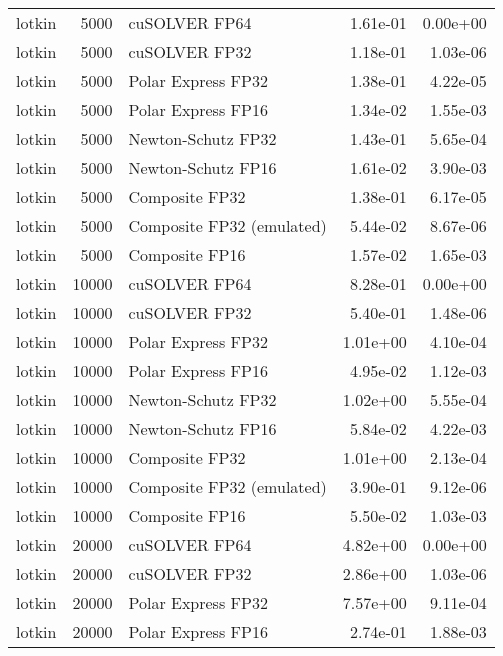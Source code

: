 \begin{table}
\begin{tabular}{lrlrr}
   lotkin &  5000 &             cuSOLVER FP64 &  1.61e-01 &        0.00e+00 \\
   lotkin &  5000 &             cuSOLVER FP32 &  1.18e-01 &        1.03e-06 \\
   lotkin &  5000 &        Polar Express FP32 &  1.38e-01 &        4.22e-05 \\
   lotkin &  5000 &        Polar Express FP16 &  1.34e-02 &        1.55e-03 \\
   lotkin &  5000 &        Newton-Schutz FP32 &  1.43e-01 &        5.65e-04 \\
   lotkin &  5000 &        Newton-Schutz FP16 &  1.61e-02 &        3.90e-03 \\
   lotkin &  5000 &            Composite FP32 &  1.38e-01 &        6.17e-05 \\
   lotkin &  5000 & Composite FP32 (emulated) &  5.44e-02 &        8.67e-06 \\
   lotkin &  5000 &            Composite FP16 &  1.57e-02 &        1.65e-03 \\
   lotkin & 10000 &             cuSOLVER FP64 &  8.28e-01 &        0.00e+00 \\
   lotkin & 10000 &             cuSOLVER FP32 &  5.40e-01 &        1.48e-06 \\
   lotkin & 10000 &        Polar Express FP32 &  1.01e+00 &        4.10e-04 \\
   lotkin & 10000 &        Polar Express FP16 &  4.95e-02 &        1.12e-03 \\
   lotkin & 10000 &        Newton-Schutz FP32 &  1.02e+00 &        5.55e-04 \\
   lotkin & 10000 &        Newton-Schutz FP16 &  5.84e-02 &        4.22e-03 \\
   lotkin & 10000 &            Composite FP32 &  1.01e+00 &        2.13e-04 \\
   lotkin & 10000 & Composite FP32 (emulated) &  3.90e-01 &        9.12e-06 \\
   lotkin & 10000 &            Composite FP16 &  5.50e-02 &        1.03e-03 \\
   lotkin & 20000 &             cuSOLVER FP64 &  4.82e+00 &        0.00e+00 \\
   lotkin & 20000 &             cuSOLVER FP32 &  2.86e+00 &        1.03e-06 \\
   lotkin & 20000 &        Polar Express FP32 &  7.57e+00 &        9.11e-04 \\
   lotkin & 20000 &        Polar Express FP16 &  2.74e-01 &        1.88e-03 \\

\end{tabular}
\end{table}
